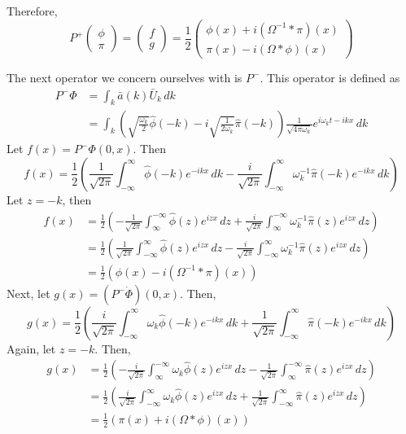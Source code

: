 \documentclass[12pt,oneside]{article}
\begin{document}
Therefore,
\begin{equation}
  P^+\begin{pmatrix}\phi\\ \pi\end{pmatrix}=\begin{pmatrix}f\\
    g\end{pmatrix}=\frac{1}{2}\begin{pmatrix}\phi(x)+i(\Omega^{-1}*\pi)(x)\\ \pi(x)-i(\Omega*\phi)(x)\end{pmatrix}
\end{equation}

The next operator we concern ourselves with is $P^-$. This operator is
defined as 
\begin{align}
P^-\Phi&=\int_k\bar{a}(k)\bar{U}_k\, dk\\
&=\int_{k}\left(\sqrt{\frac{\omega_{k}}{2}}\hat{\phi}(-k)-i\sqrt{\frac{1}{2\omega_{k}}}\hat{\pi}(-k)\right)\frac{1}{\sqrt{4\pi\omega_{k}}}e^{i\omega_kt-ikx}\, dk
\end{align}
Let $f(x)=P^{-}\Phi(0,x)$. Then
\begin{equation}
f(x)=\frac{1}{2}\left(\frac{1}{\sqrt{2\pi}}\int_{-\infty}^{\infty}\hat{\phi}(-k)e^{-ikx}\, dk-\frac{i}{\sqrt{2\pi}}\int_{-\infty}^{\infty}\omega_{k}^{-1}\hat{\pi}(-k)e^{-ikx}\, dk\right)
\end{equation}
Let $z=-k$, then
\begin{align*}
f(x)&=\frac{1}{2}\left(-\frac{1}{\sqrt{2\pi}}\int_{\infty}^{-\infty}\hat{\phi}(z)e^{izx}\, dz+\frac{i}{\sqrt{2\pi}}\int_{\infty}^{-\infty}\omega_{k}^{-1}\hat{\pi}(z)e^{izx}\, dz\right)\\
&=\frac{1}{2}\left(\frac{1}{\sqrt{2\pi}}\int_{-\infty}^{\infty}\hat{\phi}(z)e^{izx}\, dz-\frac{i}{\sqrt{2\pi}}\int_{-\infty}^{\infty}\omega^{-1}_{k}\hat{\pi}(z)e^{izx}\, dz\right)\\
&=\frac{1}{2}(\phi(x)-i(\Omega^{-1}*\pi)(x))
\end{align*}
Next, let $g(x)=(P^{-}\dot{\Phi})(0,x)$. Then,
\begin{equation}
g(x)=\frac{1}{2}\left(\frac{i}{\sqrt{2\pi}}\int^{\infty}_{-\infty}\omega_{k}\hat{\phi}(-k)e^{-ikx}\, dk+\frac{1}{\sqrt{2\pi}}\int^{\infty}_{-\infty}\hat{\pi}(-k)e^{-ikx}\, dk\right)
\end{equation}
Again, let $z=-k$. Then,
\begin{align*}
g(x)&=\frac{1}{2}\left(-\frac{i}{\sqrt{2\pi}}\int^{-\infty}_{\infty}\omega_{k}\hat{\phi}(z)e^{izx}\, dz-\frac{1}{\sqrt{2\pi}}\int^{-\infty}_{\infty}\hat{\pi}(z)e^{izx}\, dz\right) \\
&=\frac{1}{2}\left(\frac{i}{\sqrt{2\pi}}\int^{\infty}_{-\infty}\omega_{k}\hat{\phi}(z)e^{izx}\, dz+\frac{1}{\sqrt{2\pi}}\int^{\infty}_{-\infty}\hat{\pi}(z)e^{izx}\, dz\right) \\
&=\frac{1}{2}(\pi(x)+i(\Omega*\phi)(x))
\end{align*}
\end{document}
